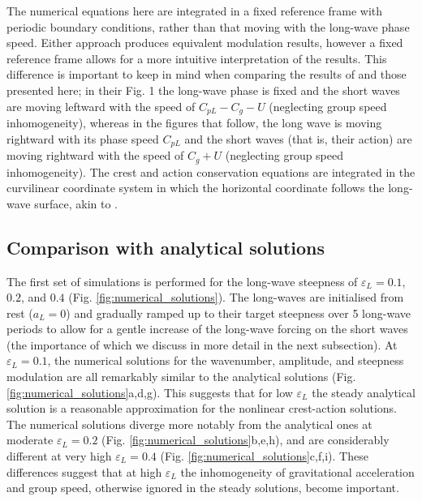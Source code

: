 \documentclass[lineno]{jfm}
\begin{document}
The numerical equations here are integrated in a fixed reference frame with
periodic boundary conditions, rather than that moving with the long-wave phase speed.
Either approach produces equivalent modulation results, however a fixed
reference frame allows for a more intuitive interpretation of the results.
This difference is important to keep in mind when comparing the results
of \citet{peureux2021unsteady} and those presented here; in their Fig. 1 the
long-wave phase is fixed and the short waves are moving leftward
with the speed of $C_{pL} - C_g - U$ (neglecting group speed inhomogeneity),
whereas in the figures that follow, the long wave is moving rightward with its
phase speed $C_{pL}$ and the short waves (that is, their action) are moving
rightward with the speed of $C_g + U$ (neglecting group speed inhomogeneity).
The crest and action conservation equations are integrated in the curvilinear
coordinate system in which the horizontal coordinate follows the long-wave
surface, akin to \citet{zhang1990evolution}.

\subsection{Comparison with analytical solutions}
\label{subsection:comparison_with_analytical_solutions}

The first set of simulations is performed for the long-wave steepness of
$\varepsilon_L = 0.1$, $0.2$, and $0.4$ (Fig. \ref{fig:numerical_solutions}).
The long-waves are initialised from rest ($a_L = 0$) and gradually ramped up
to their target steepness over 5 long-wave periods to allow for a gentle
increase of the long-wave forcing on the short waves
(the importance of which we discuss in more detail in the next subsection).
At $\varepsilon_L = 0.1$, the numerical solutions for the wavenumber, amplitude,
and steepness modulation are all remarkably similar to the analytical solutions
(Fig. \ref{fig:numerical_solutions}a,d,g).
This suggests that for low $\varepsilon_L$ the steady analytical solution
is a reasonable approximation for the nonlinear crest-action solutions.
The numerical solutions diverge more notably from the analytical ones at
moderate $\varepsilon_L = 0.2$ (Fig. \ref{fig:numerical_solutions}b,e,h),
and are considerably different at very high $\varepsilon_L = 0.4$
(Fig. \ref{fig:numerical_solutions}c,f,i).
These differences suggest that at high $\varepsilon_L$ the inhomogeneity of
gravitational acceleration and group speed, otherwise ignored in the steady
solutions, become important.
\end{document}
